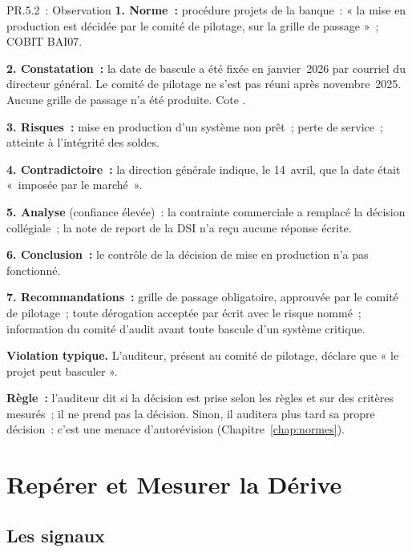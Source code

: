 \begin{boxobjet}{PR.5.2~: Observation}
\textbf{1. Norme~:} procédure projets de la banque~: « la mise en
production est décidée par le comité de pilotage, sur la grille de
passage »~; COBIT BAI07.

\textbf{2. Constatation~:} la date de bascule a été fixée en janvier~2026
par courriel du directeur général. Le comité de pilotage ne s'est pas
réuni après novembre~2025. Aucune grille de passage n'a été produite.
Cote \NON{}.

\textbf{3. Risques~:} mise en production d'un système non prêt~; perte de
service~; atteinte à l'intégrité des soldes.

\textbf{4. Contradictoire~:} la direction générale indique, le 14~avril,
que la date était «~imposée par le marché~».

\textbf{5. Analyse} (confiance élevée)~: la contrainte commerciale a
remplacé la décision collégiale~; la note de report de la DSI n'a reçu
aucune réponse écrite.

\textbf{6. Conclusion~:} le contrôle de la décision de mise en production
n'a pas fonctionné.

\textbf{7. Recommandations~:} grille de passage obligatoire, approuvée par
le comité de pilotage~; toute dérogation acceptée par écrit avec le risque
nommé~; information du comité d'audit avant toute bascule d'un système
critique.
\end{boxobjet}

\begin{boxalert}
\textbf{Violation typique.} L'auditeur, présent au comité de pilotage,
déclare que « le projet peut basculer ».

\smallskip
\textbf{Règle~:} l'auditeur dit si la décision est prise selon les règles
et sur des critères mesurés~; il ne prend pas la décision. Sinon, il
auditera plus tard sa propre décision~: c'est une menace
d'autorévision (Chapitre~\ref{chap:normes}).
\end{boxalert}

\section{Repérer et Mesurer la Dérive}
\label{sec:c19-derive}

\subsection{Les signaux}

